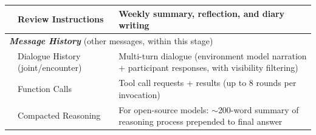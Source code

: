 \begin{table}[htbp]
\begin{tabular}{p{2.0cm} p{3.0cm} p{8.0cm}}
      & Review Instructions & Weekly summary, reflection, and diary writing \\
    \midrule
    \multicolumn{3}{l}{\textbf{\textit{Message History}} {\scriptsize (other messages, within this stage)}} \\
    \midrule
      & Dialogue History {\scriptsize (joint/encounter)} & Multi-turn dialogue (environment model narration + participant responses, with visibility filtering) \\
      & Function Calls   & Tool call requests + results (up to 8 rounds per invocation) \\
      & Compacted Reasoning & For open-source models: $\sim$200-word summary of reasoning process prepended to final answer \\
    \bottomrule
  \end{tabular}
\end{table}




